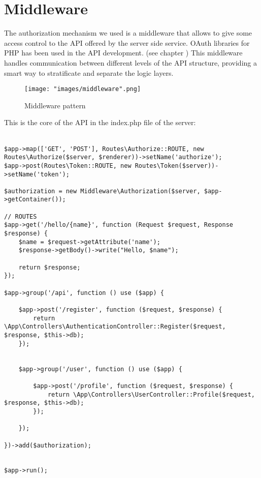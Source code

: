 \section{Middleware}
The authorization mechanism we used is a middleware that allows to give some access control to the API offered by the server side service. OAuth libraries for PHP has been used in the API development. (see chapter ) This middleware handles communication between different levels of the API structure, providing a smart way to stratificate and separate the logic layers.

\begin{figure}[H]
\begin{center}
\texttt{[image: "images/middleware".png]}
\caption{Middleware pattern}
\end{center}
\end{figure}

This is the core of the API in the index.php file of the server:\\
\\
\lstset{language=Pascal}
\begin{lstlisting}
$app->map(['GET', 'POST'], Routes\Authorize::ROUTE, new Routes\Authorize($server, $renderer))->setName('authorize');
$app->post(Routes\Token::ROUTE, new Routes\Token($server))->setName('token');

$authorization = new Middleware\Authorization($server, $app->getContainer());

// ROUTES
$app->get('/hello/{name}', function (Request $request, Response $response) {
    $name = $request->getAttribute('name');
    $response->getBody()->write("Hello, $name");

    return $response;
});

$app->group('/api', function () use ($app) {

    $app->post('/register', function ($request, $response) {
        return \App\Controllers\AuthenticationController::Register($request, $response, $this->db);
    });

    
    $app->group('/user', function () use ($app) {

        $app->post('/profile', function ($request, $response) {
            return \App\Controllers\UserController::Profile($request, $response, $this->db);
        });

    });

})->add($authorization);


$app->run();
\end{lstlisting}

